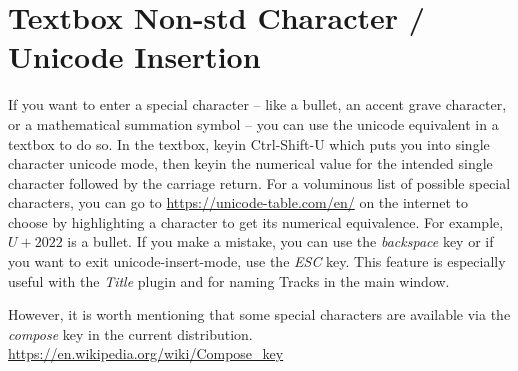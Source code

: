 \section{Textbox Non-std Character / Unicode Insertion}%
\label{sec:textbox_non_std_character_unicode}

If you want to enter a special character -- like a bullet, an accent grave character, or a mathematical summation symbol -- you can use the unicode equivalent in a textbox to do so.  In the textbox, keyin Ctrl-Shift-U which puts you into single character unicode mode, then keyin the numerical value for the intended single character followed by the carriage return.  For a voluminous list of possible special characters, you can go to {\small \url{https://unicode-table.com/en/}} on the internet to choose by highlighting a character to get its numerical equivalence.  For example, $U+2022$ is a bullet.  If you make a mistake, you can use the \textit{backspace} key or if you want to exit unicode-insert-mode, use the \textit{ESC} key.  This feature is especially useful with the \textit{Title} plugin and for naming Tracks in the main window.

However, it is worth mentioning that some special characters are available via the \textit{compose} key in the current distribution. {\small \url{https://en.wikipedia.org/wiki/Compose_key}}

